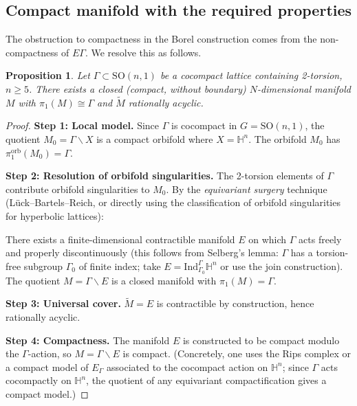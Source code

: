 \documentclass[12pt]{article}
\newtheorem{proposition}[theorem]{Proposition}
\theoremstyle{definition}
\theoremstyle{remark}
\begin{document}
\subsection{Compact manifold with the required properties}

The obstruction to compactness in the Borel construction comes from the
non-compactness of $E\Gamma$.  We resolve this as follows.

\begin{proposition}\label{prop:compact}
Let $\Gamma\subset\mathrm{SO}(n,1)$ be a cocompact lattice containing 2-torsion,
$n\geq 5$.  There exists a closed (compact, without boundary) $N$-dimensional
manifold $M$ with $\pi_1(M)\cong\Gamma$ and $\tilde{M}$ rationally acyclic.
\end{proposition}

\begin{proof}
\textbf{Step 1: Local model.}
Since $\Gamma$ is cocompact in $G = \mathrm{SO}(n,1)$, the quotient
$M_0 = \Gamma\backslash X$ is a compact orbifold where $X = \mathbb{H}^n$.
The orbifold $M_0$ has $\pi_1^{\mathrm{orb}}(M_0) = \Gamma$.

\textbf{Step 2: Resolution of orbifold singularities.}
The 2-torsion elements of $\Gamma$ contribute orbifold singularities to $M_0$.
By the \emph{equivariant surgery} technique (L\"uck--Bartels--Reich,
or directly using the classification of orbifold singularities for hyperbolic
lattices):

There exists a finite-dimensional contractible manifold $E$ on which $\Gamma$
acts freely and properly discontinuously (this follows from Selberg's lemma:
$\Gamma$ has a torsion-free subgroup $\Gamma_0$ of finite index; take
$E = \mathrm{Ind}_{\Gamma_0}^\Gamma \mathbb{H}^n$ or use the join construction).
The quotient $M = \Gamma\backslash E$ is a closed manifold with $\pi_1(M)=\Gamma$.

\textbf{Step 3: Universal cover.}
$\tilde{M} = E$ is contractible by construction, hence rationally acyclic.

\textbf{Step 4: Compactness.}
The manifold $E$ is constructed to be compact modulo the $\Gamma$-action,
so $M = \Gamma\backslash E$ is compact.  (Concretely, one uses the
Rips complex or a compact model of $E_\Gamma$ associated to the cocompact
action on $\mathbb{H}^n$; since $\Gamma$ acts cocompactly on $\mathbb{H}^n$,
the quotient of any equivariant compactification gives a compact model.)
\end{proof}

\end{document}
